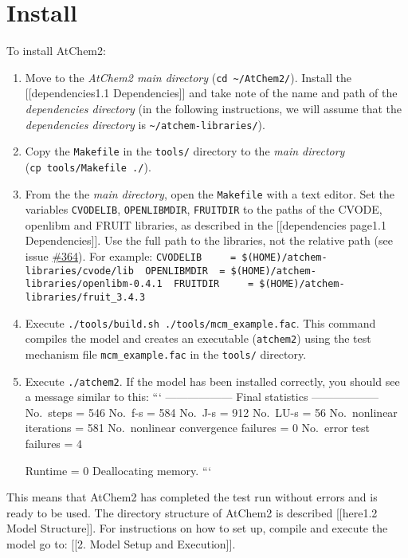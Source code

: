 \section{Install} \label{sec:install}

To install AtChem2:

\begin{enumerate}
\def\labelenumi{\arabic{enumi}.}
\item
  Move to the \emph{AtChem2 main directory}
  (\texttt{cd\ \textasciitilde{}/AtChem2/}). Install the
  {[}{[}dependencies\textbar{}1.1 Dependencies{]}{]} and take note of
  the name and path of the \emph{dependencies directory} (in the
  following instructions, we will assume that the \emph{dependencies
  directory} is \texttt{\textasciitilde{}/atchem-libraries/}).
\item
  Copy the \texttt{Makefile} in the \texttt{tools/} directory to the
  \emph{main directory} (\texttt{cp\ tools/Makefile\ ./}).
\item
  From the the \emph{main directory}, open the \texttt{Makefile} with a
  text editor. Set the variables \texttt{CVODELIB},
  \texttt{OPENLIBMDIR}, \texttt{FRUITDIR} to the paths of the CVODE,
  openlibm and FRUIT libraries, as described in the {[}{[}dependencies
  page\textbar{}1.1 Dependencies{]}{]}. Use the full path to the
  libraries, not the relative path (see issue
  \href{https://github.com/AtChem/AtChem2/issues/364}{\#364}). For
  example:
  \texttt{CVODELIB\ \ \ \ \ =\ \$(HOME)/atchem-libraries/cvode/lib\ \ OPENLIBMDIR\ \ =\ \$(HOME)/atchem-libraries/openlibm-0.4.1\ \ FRUITDIR\ \ \ \ \ =\ \$(HOME)/atchem-libraries/fruit\_3.4.3}
\item
  Execute \texttt{./tools/build.sh\ ./tools/mcm\_example.fac}. This
  command compiles the model and creates an executable
  (\texttt{atchem2}) using the test mechanism file
  \texttt{mcm\_example.fac} in the \texttt{tools/} directory.
\item
  Execute \texttt{./atchem2}. If the model has been installed correctly,
  you should see a message similar to this: ``` ------------------ Final
  statistics ------------------ No.~steps = 546 No.~f-s = 584 No.~J-s =
  912 No.~LU-s = 56 No.~nonlinear iterations = 581 No.~nonlinear
  convergence failures = 0 No.~error test failures = 4

  Runtime = 0 Deallocating memory. ```
\end{enumerate}

This means that AtChem2 has completed the test run without errors and is
ready to be used. The directory structure of AtChem2 is described
{[}{[}here\textbar{}1.2 Model Structure{]}{]}. For instructions on how
to set up, compile and execute the model go to: {[}{[}2. Model Setup and
Execution{]}{]}.

